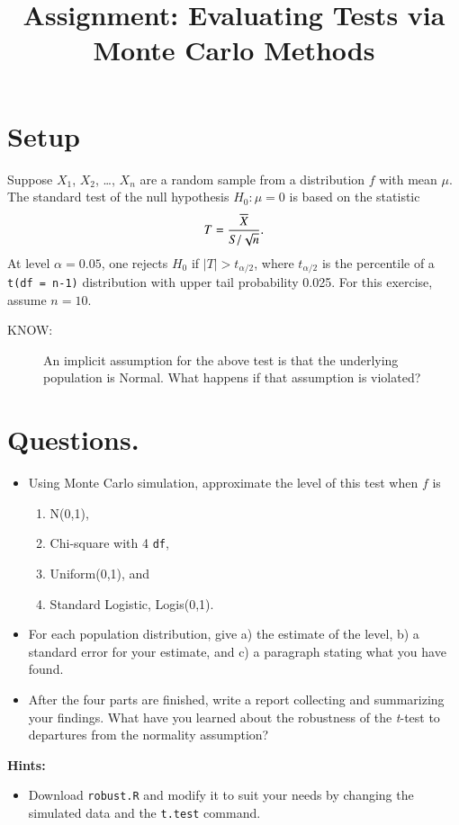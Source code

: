 \documentclass[11pt,english]{article}
\title{Assignment: Evaluating Tests via Monte Carlo Methods}
\author{}
\date{}
\begin{document}
\maketitle


\section*{Setup}
\label{sec-1}


Suppose $X_{1}$, $X_{2}$, \ldots{}, $X_{n}$ are a random sample from a distribution $f$ with mean $\mu$.  The standard test of the null hypothesis $H_{0}: \mu = 0$ is based on the statistic
\[
T = \frac{\overline{X}}{S/\sqrt{n}}.
\]
At level $\alpha = 0.05$, one rejects $H_{0}$ if $|T| > t_{\alpha/2}$, where $t_{\alpha/2}$ is the percentile of a \texttt{t(df = n-1)} distribution with upper tail probability 0.025.  For this exercise, assume $n = 10$.


\begin{description}
\item[KNOW:] An implicit assumption for the above test is that the underlying population is Normal. What happens if that assumption is violated?
\end{description}
\section*{Questions.}
\label{sec-2}


\begin{itemize}
\item Using Monte Carlo simulation, approximate the level of this test when $f$ is
\begin{enumerate}
\item N(0,1),
\item Chi-square with 4 \texttt{df},
\item Uniform(0,1), and
\item Standard Logistic, Logis(0,1).
\end{enumerate}
\item For each population distribution, give a) the estimate of the level, b) a standard error for your estimate, and c) a paragraph stating what you have found.
\item After the four parts are finished, write a report collecting and summarizing your findings.  What have you learned about the robustness of the \emph{t}-test to departures from the normality assumption?
\end{itemize}

\textbf{Hints:}

\begin{itemize}
\item Download \texttt{robust.R} and modify it to suit your needs by changing the simulated data and the \texttt{t.test} command.
\end{itemize}
\end{document}
